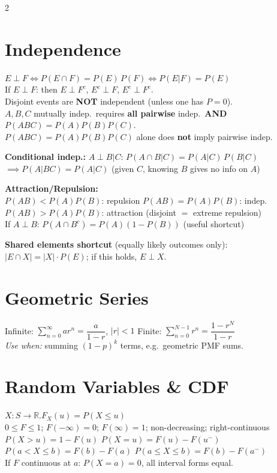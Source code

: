 \documentclass[10pt]{article}
\begin{document}
\begin{multicols*}{2}
\section{Independence}
$E \perp F \iff P(E \cap F) = P(E)\,P(F) \iff P(E|F) = P(E)$ \\
If $E \perp F$: then $E \perp F^c$,\; $E^c \perp F$,\; $E^c \perp F^c$. \\
Disjoint events are \textbf{NOT} independent (unless one has $P=0$). \\
$A,B,C$ mutually indep.\ requires \textbf{all pairwise} indep.\ \textbf{AND} $P(ABC)=P(A)P(B)P(C)$. \\
$P(ABC)=P(A)P(B)P(C)$ alone does \textbf{not} imply pairwise indep.

\textbf{Conditional indep.:} $A \perp B | C$: $P(A \cap B|C) = P(A|C)\,P(B|C)$ \\
$\implies P(A|BC) = P(A|C)$ (given $C$, knowing $B$ gives no info on $A$)

\textbf{Attraction/Repulsion:} \\
$P(AB) < P(A)P(B)$: repulsion \;\; $P(AB) = P(A)P(B)$: indep. \\
$P(AB) > P(A)P(B)$: attraction \;\; (disjoint $=$ extreme repulsion) \\
If $A \perp B$: $P(A \cap B^c) = P(A)(1-P(B))$ \; (useful shortcut)

\textbf{Shared elements shortcut} (equally likely outcomes only): \\
$|E \cap X| = |X| \cdot P(E)$;\; if this holds, $E \perp X$.

\section{Geometric Series}
Infinite: $\sum_{n=0}^{\infty} ar^n = \dfrac{a}{1-r}$, $|r|<1$ \qquad
Finite: $\sum_{n=0}^{N-1} r^n = \dfrac{1-r^N}{1-r}$ \\
\textit{Use when:} summing $(1\!-\!p)^k$ terms, e.g.\ geometric PMF sums.

\section{Random Variables \& CDF}
$X: S \to \mathbb{R}$.\quad $F_X(u) = P(X \le u)$ \\
$0 \le F \le 1$;\; $F(-\infty)=0$;\; $F(\infty)=1$;\; non-decreasing;\; right-continuous \\
$P(X > u) = 1 - F(u)$ \qquad $P(X = u) = F(u) - F(u^-)$ \\
$P(a < X \le b) = F(b) - F(a)$ \qquad $P(a \le X \le b) = F(b) - F(a^-)$ \\
If $F$ continuous at $a$: $P(X=a)=0$, all interval forms equal.


\end{multicols*}
\end{document}
